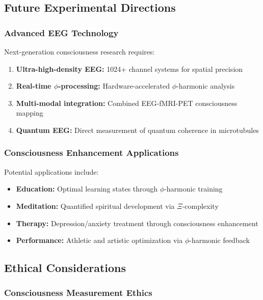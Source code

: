 \subsection{Future Experimental Directions}

\subsubsection{Advanced EEG Technology}

Next-generation consciousness research requires:
\begin{enumerate}
 \item \textbf{Ultra-high-density EEG:} 1024+ channel systems for spatial precision
 \item \textbf{Real-time $\phi$-processing:} Hardware-accelerated $\phi$-harmonic analysis
 \item \textbf{Multi-modal integration:} Combined EEG-fMRI-PET consciousness mapping
 \item \textbf{Quantum EEG:} Direct measurement of quantum coherence in microtubules
\end{enumerate}

\subsubsection{Consciousness Enhancement Applications}

Potential applications include:
\begin{itemize}
 \item \textbf{Education:} Optimal learning states through $\phi$-harmonic training
 \item \textbf{Meditation:} Quantified spiritual development via $\Xi$-complexity
 \item \textbf{Therapy:} Depression/anxiety treatment through consciousness enhancement
 \item \textbf{Performance:} Athletic and artistic optimization via $\phi$-harmonic feedback
\end{itemize}

\subsection{Ethical Considerations}

\subsubsection{Consciousness Measurement Ethics}


